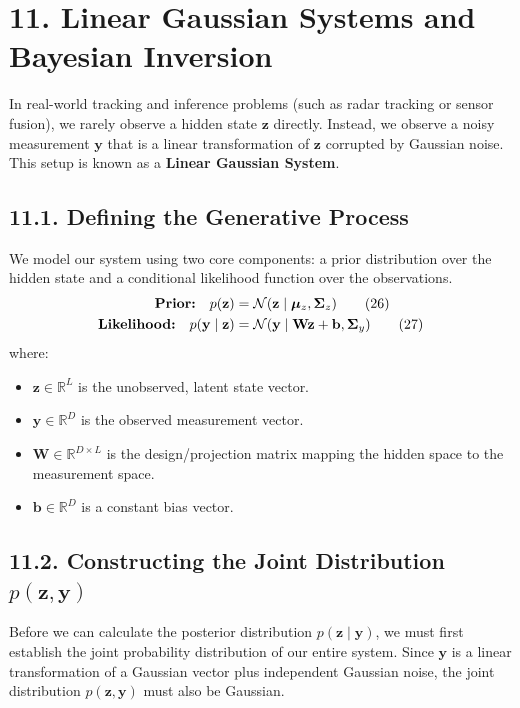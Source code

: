 \documentclass{article}
\begin{document}
\section*{11. Linear Gaussian Systems and Bayesian Inversion}

In real-world tracking and inference problems (such as radar tracking or sensor fusion), we rarely observe a hidden state $\mathbf{z}$ directly. Instead, we observe a noisy measurement $\mathbf{y}$ that is a linear transformation of $\mathbf{z}$ corrupted by Gaussian noise. This setup is known as a \textbf{Linear Gaussian System}.

\subsection*{11.1. Defining the Generative Process}
We model our system using two core components: a prior distribution over the hidden state and a conditional likelihood function over the observations.
\begin{align}
\text{\textbf{Prior:}} \quad p(\mathbf{z}) &= \mathcal{N}(\mathbf{z} \mid \boldsymbol{\mu}_z, \boldsymbol{\Sigma}_z) \tag{26} \\
\text{\textbf{Likelihood:}} \quad p(\mathbf{y} \mid \mathbf{z}) &= \mathcal{N}(\mathbf{y} \mid \mathbf{W}\mathbf{z} + \mathbf{b}, \boldsymbol{\Sigma}_y) \tag{27}
\end{align}
where:
\begin{itemize}
    \item $\mathbf{z} \in \mathbb{R}^L$ is the unobserved, latent state vector.
    \item $\mathbf{y} \in \mathbb{R}^D$ is the observed measurement vector.
    \item $\mathbf{W} \in \mathbb{R}^{D \times L}$ is the design/projection matrix mapping the hidden space to the measurement space.
    \item $\mathbf{b} \in \mathbb{R}^D$ is a constant bias vector.
\end{itemize}

\subsection*{11.2. Constructing the Joint Distribution $p(\mathbf{z}, \mathbf{y})$}
Before we can calculate the posterior distribution $p(\mathbf{z} \mid \mathbf{y})$, we must first establish the joint probability distribution of our entire system. Since $\mathbf{y}$ is a linear transformation of a Gaussian vector plus independent Gaussian noise, the joint distribution $p(\mathbf{z}, \mathbf{y})$ must also be Gaussian. 
\end{document}
